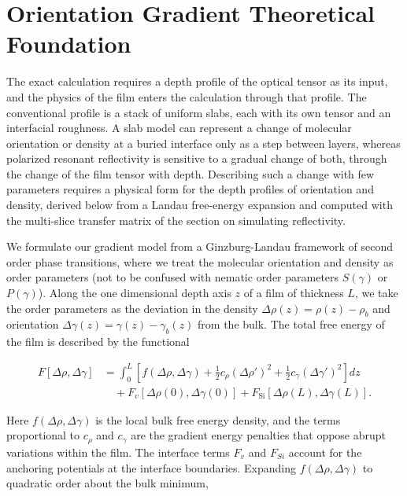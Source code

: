 \section{Orientation Gradient Theoretical Foundation}\label{sec:orientation-gradient-theoretical-foundation}

The exact calculation requires a depth profile of the optical tensor as its input, and the physics of the film enters the calculation through that profile. The conventional profile is a stack of uniform slabs, each with its own tensor and an interfacial roughness. A slab model can represent a change of molecular orientation or density at a buried interface only as a step between layers, whereas polarized resonant reflectivity is sensitive to a gradual change of both, through the change of the film tensor with depth. Describing such a change with few parameters requires a physical form for the depth profiles of orientation and density, derived below from a Landau free-energy expansion and computed with the multi-slice transfer matrix of the section on simulating reflectivity.

We formulate our gradient model from a Ginzburg-Landau framework of second order phase transitions, where we treat the molecular orientation and density as order parameters (not to be confused with nematic order parameters \(S(\gamma)\) or \(P(\gamma)\)).\autocite{gennesPhysicsLiquidCrystals2023,Ginzburg2009} Along the one dimensional depth axis \(z\) of a film of thickness \(L\), we take the order parameters as the deviation in the density \(\Delta\rho(z) = \rho(z) - \rho_{b}\) and orientation \(\Delta\gamma(z) = \gamma(z) - \gamma_{b}(z)\) from the bulk. The total free energy of the film is described by the functional

\begin{equation}
  \begin{split}
  F[\Delta\rho,\Delta\gamma] &= \int_{0}^{L} \left[ f(\Delta\rho,\Delta\gamma) + \frac{1}{2}c_{\rho}\left( \Delta\rho' \right)^{2} + \frac{1}{2}c_{\gamma}\left( \Delta\gamma' \right)^{2} \right] dz \\
  &\quad + F_{v}\left[ \Delta\rho(0),\Delta\gamma(0) \right] + F_{\mathrm{Si}}\left[ \Delta\rho(L),\Delta\gamma(L) \right].
  \end{split}
  \label{eq:free-energy}
\end{equation}

Here \(f(\Delta\rho,\Delta\gamma)\) is the local bulk free energy density, and the terms proportional to \(c_{\rho}\) and \(c_{\gamma}\) are the gradient energy penalties that oppose abrupt variations within the film. The interface terms \(F_{v}\) and \(F_{Si}\) account for the anchoring potentials at the interface boundaries. Expanding \(f(\Delta\rho,\Delta\gamma)\) to quadratic order about the bulk minimum,

